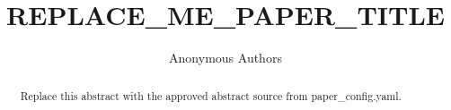 \documentclass{article}
\title{REPLACE\_ME\_PAPER\_TITLE}
\author{Anonymous Authors}
\begin{document}
\maketitle

\begin{abstract}
Replace this abstract with the approved abstract source from paper_config.yaml.
\end{abstract}












\end{document}
